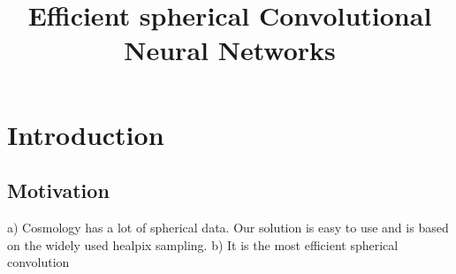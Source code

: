\documentclass[preprint,12pt,authoryear]{elsarticle}
\begin{document}
\begin{frontmatter}



\title{Efficient spherical Convolutional Neural Networks}


\author{}

\address{}

\begin{abstract}

\end{abstract}

\begin{keyword}



\end{keyword}

\end{frontmatter}


\section{Introduction}
\label{sec:intro}

\subsection{Motivation}
a) Cosmology has a lot of spherical data. Our solution is easy to use and is based on the widely used healpix sampling.
b) It is the most efficient spherical convolution
\end{document}
